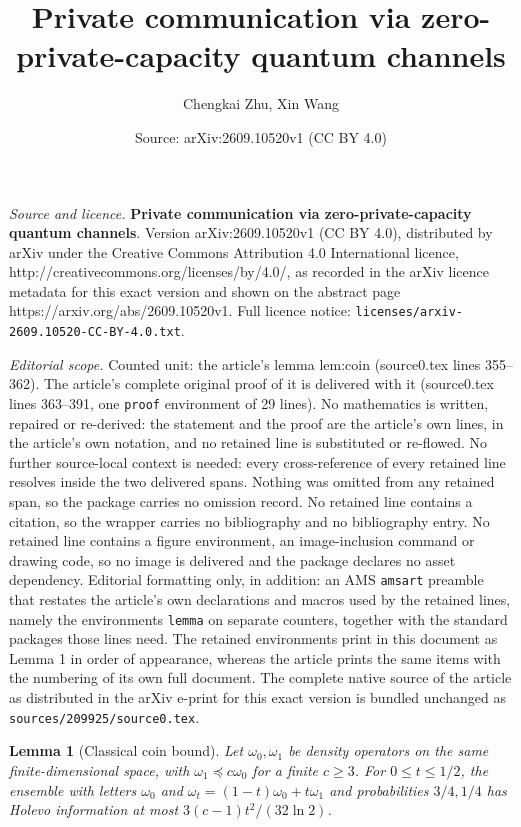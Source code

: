 \documentclass[10pt,a4paper]{amsart}
\title{\Large\textbf{Private communication via zero-private-capacity quantum channels}}
\author{Chengkai Zhu, Xin Wang}
\date{Source: arXiv:2609.10520v1 (CC BY 4.0)}
\newtheorem{lemma}{Lemma}
\begin{document}
\maketitle

\noindent\emph{Source and licence.} \Large\textbf{Private communication via zero-private-capacity quantum channels}. Version arXiv:2609.10520v1 (CC BY 4.0), distributed by arXiv under the Creative Commons Attribution 4.0 International licence, http://creativecommons.org/licenses/by/4.0/, as recorded in the arXiv licence metadata for this exact version and shown on the abstract page https://arxiv.org/abs/2609.10520v1. Full licence notice: \texttt{licenses/arxiv-2609.10520-CC-BY-4.0.txt}.\par\smallskip

\noindent\textit{Editorial scope.} Counted unit: the article's lemma lem:coin (source0.tex lines 355--362). The article's complete original proof of it is delivered with it (source0.tex lines 363--391, one \texttt{proof} environment of 29 lines). No mathematics is written, repaired or re-derived: the statement and the proof are the article's own lines, in the article's own notation, and no retained line is substituted or re-flowed.  No further source-local context is needed: every cross-reference of every retained line resolves inside the two delivered spans.  Nothing was omitted from any retained span, so the package carries no omission record.  No retained line contains a citation, so the wrapper carries no bibliography and no bibliography entry.  No retained line contains a figure environment, an image-inclusion command or drawing code, so no image is delivered and the package declares no asset dependency.  Editorial formatting only, in addition: an AMS \texttt{amsart} preamble that restates the article's own declarations and macros used by the retained lines, namely the environments \texttt{lemma} on separate counters, together with the standard packages those lines need.  The retained environments print in this document as Lemma 1 in order of appearance, whereas the article prints the same items with the numbering of its own full document.  The complete native source of the article as distributed in the arXiv e-print for this exact version is bundled unchanged as \texttt{sources/209925/source0.tex}.
\begin{lemma}[Classical coin bound]
\label{lem:coin}
Let $\omega_0,\omega_1$ be density operators on the same finite-dimensional
space, with $\omega_1\preceq c\omega_0$ for a finite $c\ge3$.
For $0\le t\le1/2$, the ensemble with letters $\omega_0$ and
$\omega_t=(1-t)\omega_0+t\omega_1$ and probabilities $3/4,1/4$
has Holevo information at most $3(c-1)t^2/(32\ln2)$.
\end{lemma}
\end{document}
